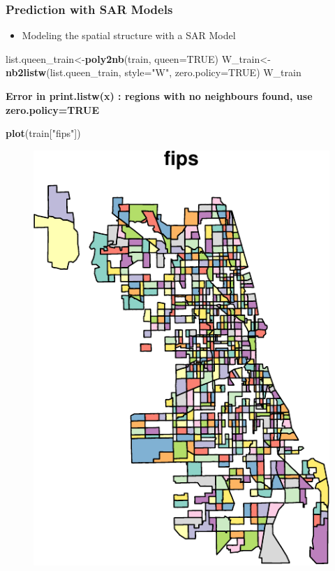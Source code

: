 \documentclass[
  shownotes,
  xcolor={svgnames},
  hyperref={colorlinks,citecolor=DarkBlue,linkcolor=DarkRed,urlcolor=DarkBlue}
  ]{beamer}
\newenvironment{Shaded}{\begin{snugshade}}{\end{snugshade}}
\newcommand{\DataTypeTok}[1]{\textcolor[rgb]{0.13,0.29,0.53}{#1}}
\newcommand{\ErrorTok}[1]{\textcolor[rgb]{0.64,0.00,0.00}{\textbf{#1}}}
\newcommand{\KeywordTok}[1]{\textcolor[rgb]{0.13,0.29,0.53}{\textbf{#1}}}
\newcommand{\NormalTok}[1]{#1}
\newcommand{\OtherTok}[1]{\textcolor[rgb]{0.56,0.35,0.01}{#1}}
\newcommand{\StringTok}[1]{\textcolor[rgb]{0.31,0.60,0.02}{#1}}
\begin{document}
\begin{frame}[fragile]
\frametitle{Prediction with SAR Models}

\begin{itemize}
  \item Modeling the spatial structure with a SAR Model
\end{itemize}


\begin{scriptsize}
\begin{Shaded}
\begin{Highlighting}[]
\NormalTok{list.queen\_train\textless{}{-}}\KeywordTok{poly2nb}\NormalTok{(train, }\DataTypeTok{queen=}\OtherTok{TRUE}\NormalTok{)}
\NormalTok{W\_train\textless{}{-}}\KeywordTok{nb2listw}\NormalTok{(list.queen\_train, }\DataTypeTok{style=}\StringTok{"W"}\NormalTok{, }\DataTypeTok{zero.policy=}\OtherTok{TRUE}\NormalTok{)}
\NormalTok{W\_train}

\ErrorTok{Error in print.listw(x) : regions with no neighbours found, use zero.policy=TRUE}

\KeywordTok{plot}\NormalTok{(train[}\StringTok{"fips"}\NormalTok{])}
\end{Highlighting}
\end{Shaded}
\end{scriptsize}

\begin{figure}[H] \centering
    \captionsetup{justification=centering}
    \includegraphics[scale=0.4]{Example_12_files/figure-latex/unnamed-chunk-8-1.pdf}
   \end{figure}


\end{frame}
\end{document}
